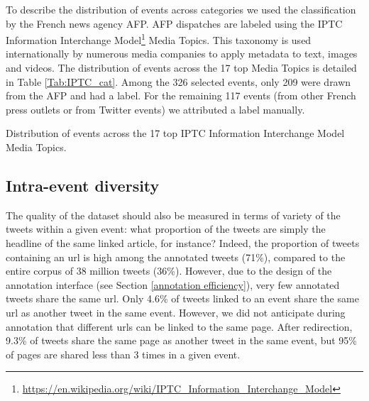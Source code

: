 %
%

To describe the distribution of events across categories we used the classification by the French news agency AFP. AFP dispatches are labeled using the IPTC Information Interchange Model\footnote{\url{https://en.wikipedia.org/wiki/IPTC_Information_Interchange_Model}} Media Topics. This taxonomy is used internationally by numerous media companies to apply metadata to text, images and videos. The distribution of events across the 17 top Media Topics is detailed in Table \ref{Tab:IPTC_cat}. Among the 326 selected events, only 209 were drawn from the AFP and had a label. For the remaining 117 events (from other French press outlets or from Twitter events) we attributed a label manually.

\begin{table}
\begin{center}
\makebox[\textwidth][c]{}
\end{center}
\caption{Distribution of events across the 17 top IPTC Information Interchange Model Media Topics. \label{Tab:IPTC_cat}}
\end{table}

\subsection{Intra-event diversity}
The quality of the dataset should also be measured in
terms of variety of the tweets within a given event: what
proportion of the tweets are simply the headline of the
same linked article, for instance? Indeed, the proportion of
tweets containing an url is high among the annotated
tweets (71\%), compared to the entire corpus of 38 million
tweets (36\%). However, due to the design of the
annotation interface (see Section \ref{annotation efficiency}), very few
annotated tweets share the same url. Only 4.6\% of tweets
linked to an event share the same url as another tweet in
the same event.
However, we did not anticipate during annotation that
different urls can be linked to the same page. After redirection,
9.3\% of tweets share the same page as another tweet in
the same event, but 95\% of pages are shared less than 3
times in a given event.

